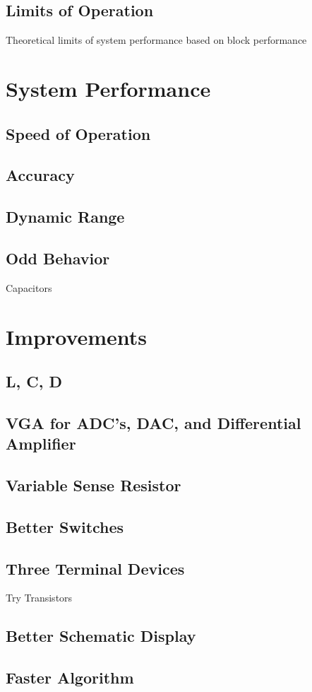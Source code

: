 \documentclass[11pt,twoside]{mitthesis}
\begin{document}
\subsection{Limits of Operation}
Theoretical limits of system performance based on block performance

\section{System Performance}
\subsection{Speed of Operation}
\subsection{Accuracy}
\subsection{Dynamic Range}
\subsection{Odd Behavior}
Capacitors

\section{Improvements}
\subsection{L, C, D}
\subsection{VGA for ADC's, DAC, and Differential Amplifier}
\subsection{Variable Sense Resistor}
\subsection{Better Switches}
\subsection{Three Terminal Devices}
Try Transistors
\subsection{Better Schematic Display}
\subsection{Faster Algorithm}

\ifdefined\DEBUG
\end{document}
